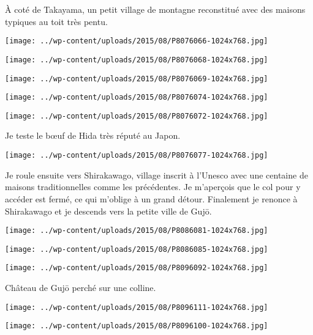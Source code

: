 \pagebreak
 \`A coté de Takayama, un petit village de montagne reconstitué avec des maisons typiques au toit très pentu. 
\begin{center} \texttt{[image: ../wp-content/uploads/2015/08/P8076066-1024x768.jpg]} \end{center}
\begin{center} \texttt{[image: ../wp-content/uploads/2015/08/P8076068-1024x768.jpg]} \end{center}
\begin{center} \texttt{[image: ../wp-content/uploads/2015/08/P8076069-1024x768.jpg]} \end{center}
\begin{center} \texttt{[image: ../wp-content/uploads/2015/08/P8076074-1024x768.jpg]} \end{center}
\begin{center} \texttt{[image: ../wp-content/uploads/2015/08/P8076072-1024x768.jpg]} \end{center}

 Je teste le b\oe{}uf de Hida très réputé au Japon. 
\begin{center} \texttt{[image: ../wp-content/uploads/2015/08/P8076077-1024x768.jpg]} \end{center}

\pagebreak
 Je roule ensuite vers Shirakawago, village inscrit à l'Unesco avec une centaine de maisons traditionnelles comme les précédentes. Je m'aperçois que le col pour y accéder est fermé, ce qui m'oblige à un grand détour. Finalement je renonce à Shirakawago et je descends vers la petite ville de Gujō. 
\begin{center} \texttt{[image: ../wp-content/uploads/2015/08/P8086081-1024x768.jpg]} \end{center}
\begin{center} \texttt{[image: ../wp-content/uploads/2015/08/P8086085-1024x768.jpg]} \end{center}
\begin{center} \texttt{[image: ../wp-content/uploads/2015/08/P8096092-1024x768.jpg]} \end{center}

  Château de Gujō perché sur une colline. 
\begin{center} \texttt{[image: ../wp-content/uploads/2015/08/P8096111-1024x768.jpg]} \end{center}
\begin{center} \texttt{[image: ../wp-content/uploads/2015/08/P8096100-1024x768.jpg]} \end{center}

